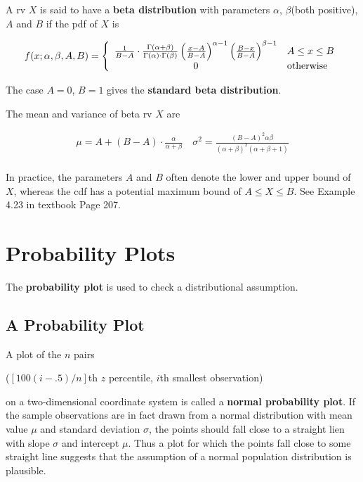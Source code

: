 \begin{definition}
    A rv $X$ is said to have a \textbf{beta distribution} with parameters $\alpha$, $\beta$(both positive), $A$ and $B$ if the pdf of $X$ is 

    \begin{align*}
        f(x;\alpha,\beta,A,B) = \left\{\begin{array}{cl}
            \frac{1}{B-A}\cdot\frac{\Gamma(\alpha+\beta)}{\Gamma(\alpha)\cdot\Gamma(\beta)}\left(\frac{x-A}{B-A}\right)^{\alpha-1}\left(\frac{B-x}{B-A}\right)^{\beta-1} & A\leq x\leq B \\
            0 & {\rm otherwise} \\
        \end{array}\right.
    \end{align*}

    The case $A=0$, $B=1$ gives the \textbf{standard beta distribution}.

    The mean and variance of beta rv $X$ are 

    \begin{align*}
        \mu = A + (B -A) \cdot \frac{\alpha}{\alpha + \beta} \quad \sigma^2 = \frac{(B-A)^2\alpha\beta}{(\alpha + \beta)^2(\alpha + \beta + 1)} \\
    \end{align*}

    In practice, the parameters $A$ and $B$ often denote the lower and upper bound of $X$, whereas the cdf has a potential maximum bound of $A\leq X\leq B$. See Example 4.23 in textbook Page 207.
\end{definition}

\section{Probability Plots}

\begin{definition}
    The \textbf{probability plot} is used to check a distributional assumption.
\end{definition}

\subsection{A Probability Plot}

\begin{definition}
    A plot of the $n$ pairs 

    \begin{center}
        ($[100(i-.5)/n]$th $z$ percentile, $i$th smallest observation)
    \end{center}

    on a two-dimensional coordinate system is called a \textbf{normal probability plot}. If the sample observations are in fact drawn from a normal distribution with mean value $\mu$ and standard deviation $\sigma$, the points should fall close to a straight lien with slope $\sigma$ and intercept $\mu$. Thus a plot for which the points fall close to some straight line suggests that the assumption of a normal population distribution is plausible.
\end{definition}

